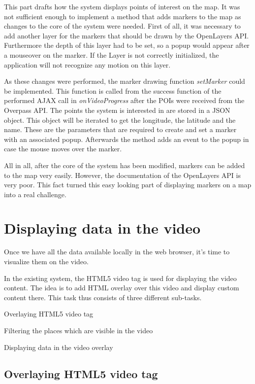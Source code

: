 \documentclass[journal]{IEEEtran}
\begin{document}
This part drafts how the system displays points of interest on the map. It was not sufficient enough to implement a method that adds markers to the map as changes to the core of the system were needed. First of all, it was necessary to add another layer for the markers that should be drawn by the OpenLayers API. Furthermore the depth of this layer had to be set, so a popup would appear after a mouseover on the marker. If the Layer is not correctly initialized, the application will not recognize any motion on this layer.

As these changes were performed, the marker drawing function \textit{setMarker} could be implemented. This function is called from the success function of the performed AJAX call in \textit{onVideoProgress} after the POIs were received from the Overpass API. The points the system is interested in are stored in a JSON object. This object will be iterated to get the longitude, the latitude and the name. These are the parameters that are required to create and set a marker with an associated popup. Afterwards the method adds an event to the popup in case the mouse moves over the marker.

All in all, after the core of the system has been modified, markers can be added to the map very easily. However, the documentation of the OpenLayers API is very poor. This fact turned this easy looking part of displaying markers on a map into a real challenge.


\section{Displaying data in the video}

Once we have all the data available locally in the web browser, it's time to visualize them on the video. 

In the existing system, the HTML5 video tag is used for displaying the video content. The idea is to add HTML overlay over this video and display custom content there. This task thus consists of three different sub-tasks.

	\begin{list}{•}{}
		\item Overlaying HTML5 video tag
		\item Filtering the places which are visible in the video
		\item Displaying data in the video overlay
	\end{list}

\subsection{Overlaying HTML5 video tag}
\end{document}
